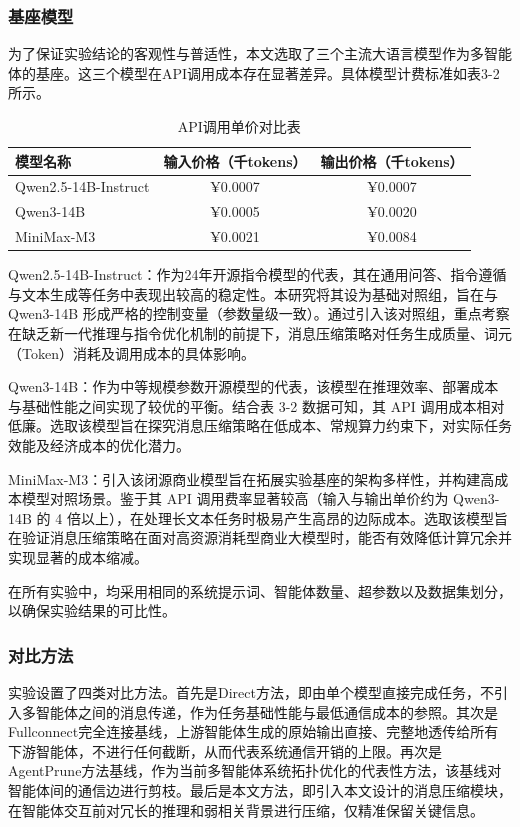 \documentclass[11pt, a4paper]{article}
\numberwithin{figure}{section}
\begin{document}
\subsubsection{基座模型}
为了保证实验结论的客观性与普适性，本文选取了三个主流大语言模型作为多智能体的基座。这三个模型在API调用成本存在显著差异。具体模型计费标准如表3-2所示。
\vspace{26pt}
\begin{table}[H]
    \centering
    {
        \fontsize{12pt}{26pt}\selectfont
        \begin{tabular}{|l|c|c|}
            \hline
            模型名称 & 输入价格（千tokens） & 输出价格（千tokens）\\
            \hline
            Qwen2.5-14B-Instruct  & ¥0.0007 & ¥0.0007 \\
            \hline
            Qwen3-14B  & ¥0.0005 & ¥0.0020 \\
            \hline
            MiniMax-M3  & ¥0.0021 & ¥0.0084 \\
            \hline

        \end{tabular}
    }
    \caption{API调用单价对比表}
    \label{tab:base_model_api_price}
\end{table}

Qwen2.5-14B-Instruct：作为24年开源指令模型的代表，其在通用问答、指令遵循与文本生成等任务中表现出较高的稳定性。本研究将其设为基础对照组，旨在与 Qwen3-14B 形成严格的控制变量（参数量级一致）。通过引入该对照组，重点考察在缺乏新一代推理与指令优化机制的前提下，消息压缩策略对任务生成质量、词元（Token）消耗及调用成本的具体影响。

Qwen3-14B：作为中等规模参数开源模型的代表，该模型在推理效率、部署成本与基础性能之间实现了较优的平衡。结合表 3-2 数据可知，其 API 调用成本相对低廉。选取该模型旨在探究消息压缩策略在低成本、常规算力约束下，对实际任务效能及经济成本的优化潜力。

MiniMax-M3：引入该闭源商业模型旨在拓展实验基座的架构多样性，并构建高成本模型对照场景。鉴于其 API 调用费率显著较高（输入与输出单价约为 Qwen3-14B 的 4 倍以上），在处理长文本任务时极易产生高昂的边际成本。选取该模型旨在验证消息压缩策略在面对高资源消耗型商业大模型时，能否有效降低计算冗余并实现显著的成本缩减。

在所有实验中，均采用相同的系统提示词、智能体数量、超参数以及数据集划分，以确保实验结果的可比性。


\subsubsection{对比方法}实验设置了四类对比方法。首先是Direct方法，即由单个模型直接完成任务，不引入多智能体之间的消息传递，作为任务基础性能与最低通信成本的参照。其次是Fullconnect完全连接基线，上游智能体生成的原始输出直接、完整地透传给所有下游智能体，不进行任何截断，从而代表系统通信开销的上限。再次是AgentPrune方法基线，作为当前多智能体系统拓扑优化的代表性方法，该基线对智能体间的通信边进行剪枝。最后是本文方法，即引入本文设计的消息压缩模块，在智能体交互前对冗长的推理和弱相关背景进行压缩，仅精准保留关键信息。
\end{document}
